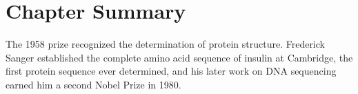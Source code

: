 \clearpage

\section*{Chapter Summary}

The 1958 prize recognized the determination of protein structure. Frederick Sanger established the complete amino acid sequence of insulin at Cambridge, the first protein sequence ever determined, and his later work on DNA sequencing earned him a second Nobel Prize in 1980.

